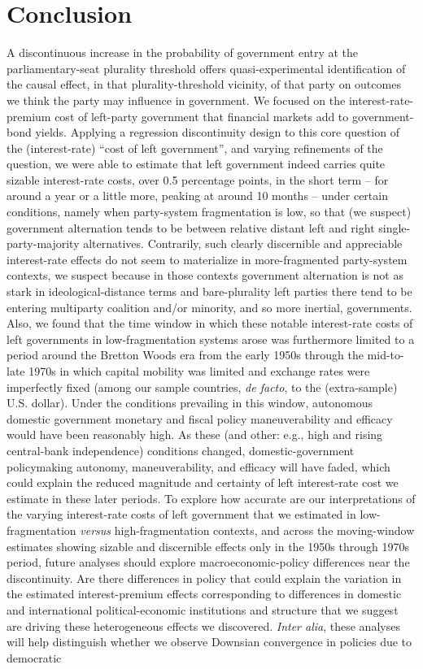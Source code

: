 \documentclass[12pt]{article}
\begin{document}
\section{Conclusion}

A discontinuous increase in the probability of government entry at the  parliamentary-seat plurality threshold offers quasi-experimental identification of the causal effect, in that plurality-threshold vicinity, of that party on outcomes we think the party may influence in government. We focused on the interest-rate-premium cost of left-party government that financial markets add to government-bond yields. Applying a regression discontinuity design to this core question of the (interest-rate) ``cost of left government'', and varying refinements of the question, we were able to estimate that left government indeed carries quite sizable interest-rate costs, over 0.5 percentage points, in the short term -- for around a year or a little more, peaking at around 10 months -- under certain conditions, namely when party-system fragmentation is low, so that (we suspect) government alternation tends to be between relative distant left and right single-party-majority alternatives. Contrarily, such clearly discernible and appreciable interest-rate effects do not seem to materialize in more-fragmented party-system contexts, we suspect because in those contexts government alternation is not as stark in ideological-distance terms and bare-plurality left parties there tend to be entering multiparty coalition and/or minority, and so more inertial, governments. Also, we found that the time window in which these notable interest-rate costs of left governments in low-fragmentation systems arose was furthermore limited to a period around the Bretton Woods era from the early 1950s through the mid-to-late 1970s in which capital mobility was limited and exchange rates were imperfectly fixed (among our sample countries, \textit{de facto}, to the (extra-sample) U.S. dollar). Under the conditions prevailing in this window, autonomous domestic government monetary and fiscal policy maneuverability and efficacy would have been reasonably high. As these (and other: e.g., high and rising central-bank independence) conditions changed, domestic-government policymaking autonomy, maneuverability, and efficacy will have faded, which could explain the reduced magnitude and certainty of left interest-rate cost we estimate in these later periods. To explore how accurate are our interpretations of the varying interest-rate costs of left government that we estimated in low-fragmentation \textit{versus} high-fragmentation contexts, and across the moving-window estimates showing sizable and discernible effects only in the 1950s through 1970s period, future analyses should explore macroeconomic-policy differences near the discontinuity. Are there differences in policy that could explain the variation in the estimated interest-premium effects corresponding to differences in domestic and international political-economic institutions and structure that we suggest are driving these heterogeneous effects we discovered. \textit{Inter alia}, these analyses will help distinguish whether we observe Downsian convergence in policies due to democratic 
\end{document}
